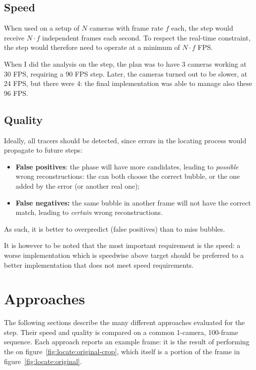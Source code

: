 \subsection{Speed}

When used on a setup of $N$ cameras with frame rate $f$ each, the \locate* step would receive $N{\cdot}f$ independent frames each second.
To respect the real-time constraint, the \locate* step would therefore need to operate at a minimum of $N{\cdot}f$ FPS.

When I did the analysis on the \locate* step, the plan was to have 3 cameras working at 30 FPS, requiring a 90 FPS \locate* step.
Later, the cameras turned out to be slower, at 24 FPS, but there were 4: the final \locate* implementation was able to manage also these 96 FPS.

\subsection{Quality}

Ideally, all tracers should be detected, since errors in the locating process would propagate to future steps:
\begin{itemize}
	\itemsep 0em
	\item \textbf{False positives}: the \match* phase will have more candidates, leading to \textit{possible} wrong reconstructions: the \match* can both choose the correct bubble, or the one added by the error (or another real one);
	\item \textbf{False negatives:} the same bubble in another frame will not have the correct match, leading to \textit{certain} wrong reconstructions.
\end{itemize}
As such, it is better to overpredict (false positives) than to miss bubbles.

It is however to be noted that the most important requirement is the speed: a worse implementation which is speedwise above target should be preferred to a better implementation that does not meet speed requirements.

\section{Approaches}
\label{sec:locate:approaches}

The following sections describe the many different approaches evaluated for the \locate* step.
Their speed and quality is compared on a common 1-camera, 100-frame sequence.
Each approach reports an example frame: it is the result of performing the \locate* on figure~\ref{fig:locate:original-crop}, which itself is a portion of the frame in figure~\ref{fig:locate:original}.

